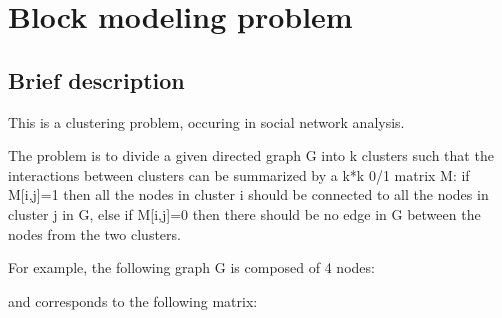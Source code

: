 \documentclass[letterpaper,10pt,openany,oneside,english]{sphinxmanual}
\let\sphinxpxdimen\pdfpxdimen\else\newdimen\sphinxpxdimen
\begin{document}
\begin{sphinxVerbatim}[commandchars=\\\{\}]
  
 
	\PYG{p}{[}\PYG{p}{]}
\end{sphinxVerbatim}

\sphinxstepscope


\section{Block modeling problem}
\label{\detokenize{examples/tuto_bmp:block-modeling-problem}}\label{\detokenize{examples/tuto_bmp:tuto-bmp}}\label{\detokenize{examples/tuto_bmp::doc}}



\subsection{Brief description}
\label{\detokenize{examples/tuto_bmp:brief-description}}
\sphinxAtStartPar
This is a clustering problem, occuring in social network analysis.

\sphinxAtStartPar
The problem is to divide a given directed graph G into k clusters such that the interactions between clusters can be summarized by a k*k 0/1 matrix M: if M{[}i,j{]}=1 then all the nodes in cluster i should be connected to all the nodes in cluster j in G, else if M{[}i,j{]}=0 then there should be no edge in G between the nodes from the two clusters.

\sphinxAtStartPar
For example, the following graph G is composed of 4 nodes:

\noindent\sphinxincludegraphics[height=200\sphinxpxdimen]{{graph}.png}

\sphinxAtStartPar
and corresponds to the following matrix:

\noindent\sphinxincludegraphics[height=100\sphinxpxdimen]{{matrix}.png}
\end{document}
